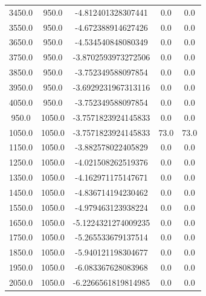 \documentclass[12pt]{report}
\begin{document}
\begin{table}[htbp]
\begin{tabular}{cc|c|c|c}
3450.0 & 950.0 & -4.812401328307441 & 0.0   & 0.0 \\
3550.0 & 950.0 & -4.672388914627426 & 0.0   & 0.0 \\
3650.0 & 950.0 & -4.534540848080349 & 0.0   & 0.0 \\
3750.0 & 950.0 & -3.8702593973272506 & 0.0   & 0.0 \\
3850.0 & 950.0 & -3.752349588097854 & 0.0   & 0.0 \\
3950.0 & 950.0 & -3.6929231967313116 & 0.0   & 0.0 \\
4050.0 & 950.0 & -3.752349588097854 & 0.0   & 0.0 \\
950.0 & 1050.0 & -3.7571823924145833 & 0.0   & 0.0 \\
1050.0 & 1050.0 & -3.7571823924145833 & 73.0  & 73.0 \\
1150.0 & 1050.0 & -3.882578022405829 & 0.0   & 0.0 \\
1250.0 & 1050.0 & -4.021508262519376 & 0.0   & 0.0 \\
1350.0 & 1050.0 & -4.162971175147671 & 0.0   & 0.0 \\
1450.0 & 1050.0 & -4.836714194230462 & 0.0   & 0.0 \\
1550.0 & 1050.0 & -4.979463123938224 & 0.0   & 0.0 \\
1650.0 & 1050.0 & -5.1224321274009235 & 0.0   & 0.0 \\
1750.0 & 1050.0 & -5.265533679137514 & 0.0   & 0.0 \\
1850.0 & 1050.0 & -5.940121198304677 & 0.0   & 0.0 \\
1950.0 & 1050.0 & -6.083367628083968 & 0.0   & 0.0 \\
2050.0 & 1050.0 & -6.2266561819814985 & 0.0   & 0.0 \\


\end{tabular}%
\label{tab:addlabel}%
\end{table}%







 
\end{document}
